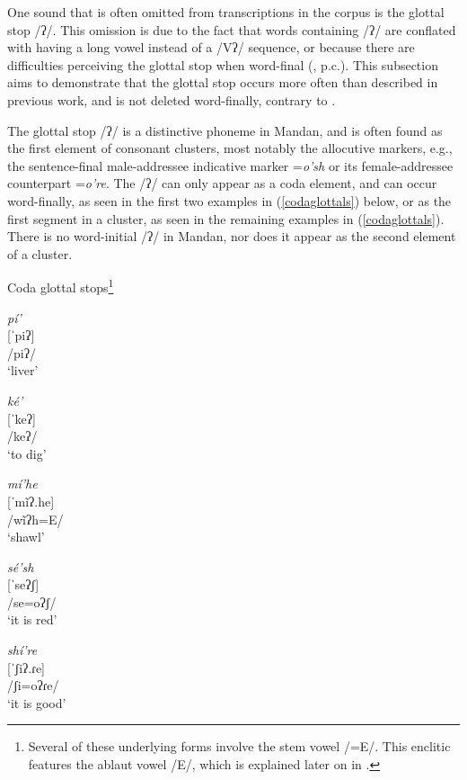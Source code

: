 One sound that is often omitted from transcriptions in the corpus is the glottal stop /ʔ/. This omission is due to the fact that words containing /ʔ/ are conflated with having a long vowel instead of a /Vʔ/ sequence, or because there are difficulties perceiving the glottal stop when word-final (\citealt{hollow1970}, \citeauthor{boyle2007} p.c.). This subsection aims to demonstrate that the glottal stop occurs more often than described in previous work, and is not deleted word-finally, contrary to \citet[43]{hollow1970}.

The glottal stop /ʔ/ is a distinctive phoneme in Mandan, and is often found as the first element of consonant clusters, most notably the allocutive markers, e.g., the sentence-final male-addressee indicative marker =\textit{o'sh} or its female-addressee counterpart =\textit{o're}. The /ʔ/ can only appear as a coda element, and can occur word-finally, as seen in the first two examples in (\ref{codaglottals}) below, or as the first segment in a cluster, as seen in the remaining examples in (\ref{codaglottals}). There is no word-initial /ʔ/ in Mandan, nor does it appear as the second element of a cluster.
\begin{exe}

\newpage
\item\label{codaglottals} Coda glottal stops\footnote{Several of these underlying forms involve the stem vowel /=E/. This enclitic features the ablaut vowel /E/, which is explained later on in .}

\begin{xlist}

\item 	\textit{pí'}\\
	{[}ˈpiʔ]\\
        /piʔ/\\
	`liver'

\item 	\textit{ké'}\\
    {[}ˈkeʔ]\\
    /keʔ/\\
    `to dig'

\item 	\textit{mí'he}\\
	{[}ˈmĩʔ.he]\\
        /wĩʔh=E/\\
	`shawl'

\item 	\textit{sé'sh}\\
    {[}ˈseʔʃ]\\
    /se=oʔʃ/\\
    `it is red'

\item 	\textit{shí're}\\
        {[}ˈʃiʔ.ɾe]\\
        /ʃi=oʔɾe/\\
	`it is good'

\end{xlist}

\end{exe}

